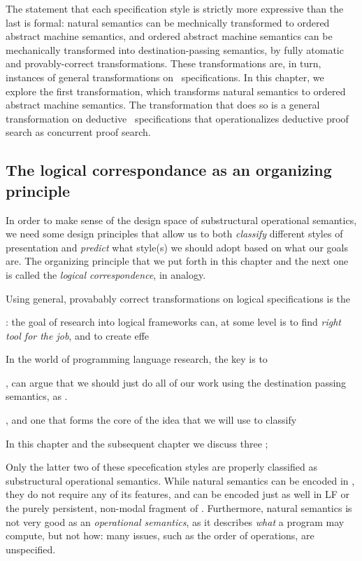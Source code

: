 \noindent
The statement that each specification style is strictly more
expressive than the last is formal: natural semantics can be
mechnically transformed to ordered abstract machine semantics, and
ordered abstract machine semantics can be mechanically transformed
into destination-passing semantics, by fully atomatic and
provably-correct transformations. These transformations are, in turn,
instances of general transformations on \sls~specifications. In this
chapter, we explore the first transformation, which transforms natural
semantics to ordered abstract machine semantics. The transformation
that does so is a general transformation on deductive
\sls~specifications that operationalizes deductive proof search as
concurrent proof search.

\subsection*{The logical correspondance as an organizing principle}

In order to make sense of the design space of substructural
operational semantics, we need some design principles that allow us to
both {\it classify} different styles of presentation and {\it predict}
what style(s) we should adopt based on what our goals are.  The
organizing principle that we put forth in this chapter and the next
one is called the {\it logical correspondence}, in analogy.

Using general, provabably correct transformations on logical
specifications is the 


: the goal of research into logical frameworks can, at some level  is to find {\it
  right tool for the job}, and to create effe

In the world of
programming language research, the key is to 


, can argue that we should just do all of our work using
the destination passing semantics, as .

, and one that forms the
core of the idea that we will use to classify 


In this chapter and the subsequent chapter
we discuss three ; 

\noindent
Only the latter two of these specefication styles are properly
classified as substructural operational semantics. While natural
semantics can be encoded in \sls, they do not require any of its
features, and can be encoded just as well in LF or the purely
persistent, non-modal fragment of \sls. Furthermore, natural semantics
is not very good as an {\it operational semantics}, as it describes
{\it what} a program may compute, but not how: many issues, such as
the order of operations, are unspecified. 

